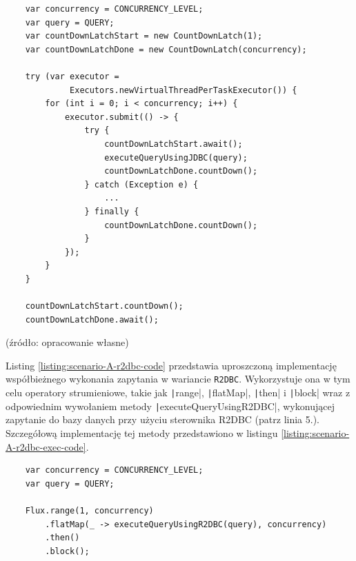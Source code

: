 \begin{listing}[!ht]
    \begin{verbatim}
    var concurrency = CONCURRENCY_LEVEL;
    var query = QUERY;
    var countDownLatchStart = new CountDownLatch(1);
    var countDownLatchDone = new CountDownLatch(concurrency);

    try (var executor = 
             Executors.newVirtualThreadPerTaskExecutor()) {
        for (int i = 0; i < concurrency; i++) {
            executor.submit(() -> {
                try {
                    countDownLatchStart.await();
                    executeQueryUsingJDBC(query);
                    countDownLatchDone.countDown();
                } catch (Exception e) { 
                    ...
                } finally {
                    countDownLatchDone.countDown();
                }
            });
        }
    }

    countDownLatchStart.countDown();
    countDownLatchDone.await();
    \end{verbatim}
    \vspace{-10pt}
    \caption{Uproszczona implementacja współbieżnego wykonania zapytania w~ramach scenariusza $\mathcal{A}$ w wariancie \texttt{JDBC+VT}}
    \label{listing:scenario-A-jdbc-vt-code}
\end{listing}

\vspace{-25pt}
\begin{center}
    \small{(źródło: opracowanie własne)}
\end{center}

Listing \ref{listing:scenario-A-r2dbc-code} przedstawia uproszczoną implementację współbieżnego wykonania zapytania w wariancie \texttt{R2DBC}. Wykorzystuje ona w tym celu operatory strumieniowe, takie jak \texttt|range|, \texttt|flatMap|, \texttt|then| i \texttt|block| wraz z odpowiednim wywołaniem metody \texttt|executeQueryUsingR2DBC|, wykonującej zapytanie do bazy danych przy użyciu sterownika R2DBC (patrz linia 5.). Szczegółową implementację tej metody przedstawiono w listingu \ref{listing:scenario-A-r2dbc-exec-code}.

\newpage
\begin{listing}[!ht]
    \begin{verbatim}
    var concurrency = CONCURRENCY_LEVEL;
    var query = QUERY;
    
    Flux.range(1, concurrency)
        .flatMap(_ -> executeQueryUsingR2DBC(query), concurrency)
        .then()
        .block();
    \end{verbatim}
    \vspace{-10pt}
    \caption{Uproszczona implementacja współbieżnego wykonania zapytania w~ramach scenariusza $\mathcal{A}$ w wariancie \texttt{R2DBC}}
    \label{listing:scenario-A-r2dbc-code}
\end{listing}

